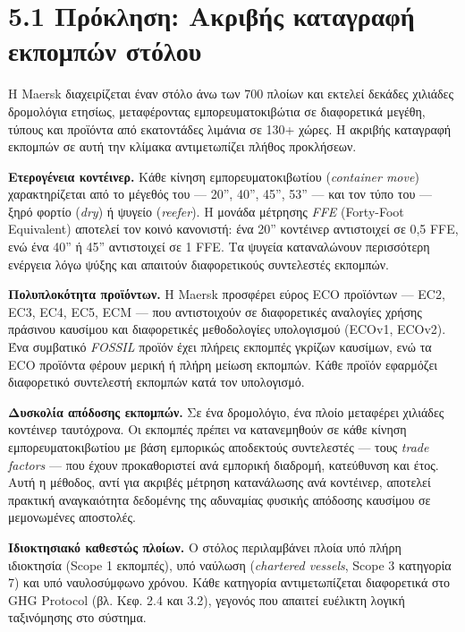 \section{5.1 Πρόκληση: Ακριβής καταγραφή εκπομπών
στόλου}\label{ux3c0ux3c1ux3ccux3baux3bbux3b7ux3c3ux3b7-ux3b1ux3baux3c1ux3b9ux3b2ux3aeux3c2-ux3baux3b1ux3c4ux3b1ux3b3ux3c1ux3b1ux3c6ux3ae-ux3b5ux3baux3c0ux3bfux3bcux3c0ux3ceux3bd-ux3c3ux3c4ux3ccux3bbux3bfux3c5}

Η Maersk διαχειρίζεται έναν στόλο άνω των 700 πλοίων και εκτελεί δεκάδες
χιλιάδες δρομολόγια ετησίως, μεταφέροντας εμπορευματοκιβώτια σε
διαφορετικά μεγέθη, τύπους και προϊόντα από εκατοντάδες λιμάνια σε 130+
χώρες. Η ακριβής καταγραφή εκπομπών σε αυτή την κλίμακα αντιμετωπίζει
πλήθος προκλήσεων.

\textbf{Ετερογένεια κοντέινερ.} Κάθε κίνηση εμπορευματοκιβωτίου
(\emph{container move}) χαρακτηρίζεται από το μέγεθός του --- 20'',
40'', 45'', 53'' --- και τον τύπο του --- ξηρό φορτίο (\emph{dry}) ή
ψυγείο (\emph{reefer}). Η μονάδα μέτρησης \emph{FFE} (Forty-Foot
Equivalent) αποτελεί τον κοινό κανονιστή: ένα 20'' κοντέινερ αντιστοιχεί
σε 0,5 FFE, ενώ ένα 40'' ή 45'' αντιστοιχεί σε 1 FFE. Τα ψυγεία
καταναλώνουν περισσότερη ενέργεια λόγω ψύξης και απαιτούν διαφορετικούς
συντελεστές εκπομπών.

\textbf{Πολυπλοκότητα προϊόντων.} Η Maersk προσφέρει εύρος ECO προϊόντων
--- EC2, EC3, EC4, EC5, ECM --- που αντιστοιχούν σε διαφορετικές
αναλογίες χρήσης πράσινου καυσίμου και διαφορετικές μεθοδολογίες
υπολογισμού (ECOv1, ECOv2). Ένα συμβατικό \emph{FOSSIL} προϊόν έχει
πλήρεις εκπομπές γκρίζων καυσίμων, ενώ τα ECO προϊόντα φέρουν μερική ή
πλήρη μείωση εκπομπών. Κάθε προϊόν εφαρμόζει διαφορετικό συντελεστή
εκπομπών κατά τον υπολογισμό.

\textbf{Δυσκολία απόδοσης εκπομπών.} Σε ένα δρομολόγιο, ένα πλοίο
μεταφέρει χιλιάδες κοντέινερ ταυτόχρονα. Οι εκπομπές πρέπει να
κατανεμηθούν σε κάθε κίνηση εμπορευματοκιβωτίου με βάση εμπορικώς
αποδεκτούς συντελεστές --- τους \emph{trade factors} --- που έχουν
προκαθοριστεί ανά εμπορική διαδρομή, κατεύθυνση και έτος. Αυτή η
μέθοδος, αντί για ακριβές μέτρηση κατανάλωσης ανά κοντέινερ, αποτελεί
πρακτική αναγκαιότητα δεδομένης της αδυναμίας φυσικής απόδοσης καυσίμου
σε μεμονωμένες αποστολές.

\textbf{Ιδιοκτησιακό καθεστώς πλοίων.} Ο στόλος περιλαμβάνει πλοία υπό
πλήρη ιδιοκτησία (Scope 1 εκπομπές), υπό ναύλωση (\emph{chartered
vessels}, Scope 3 κατηγορία 7) και υπό ναυλοσύμφωνο χρόνου. Κάθε
κατηγορία αντιμετωπίζεται διαφορετικά στο GHG Protocol (βλ. Κεφ. 2.4 και
3.2), γεγονός που απαιτεί ευέλικτη λογική ταξινόμησης στο σύστημα.

